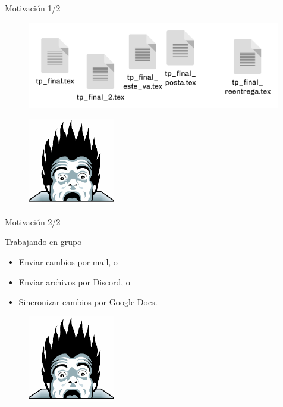 
\begin{frame}{Motivación 1/2}

    \begin{figure}[ht]
        \begin{center}
            \includegraphics[height=1.5in]{images/caos.png}
        \end{center}
    \end{figure}

    \pause
    \begin{figure}[ht]
        \begin{center}
            \includegraphics[height=1.5in]{images/horror.png}
        \end{center}
    \end{figure}
\end{frame}
\begin{frame}{Motivación 2/2}

    \begin{block}{Trabajando en grupo}
        \begin{itemize}
            \item Enviar cambios por mail, o
            \pause
            \item Enviar archivos por Discord, o
            \pause
            \item Sincronizar cambios por Google Docs.
        \end{itemize}
    \end{block}

    \pause
    \begin{figure}[h]
        \begin{center}
            \includegraphics[height=1.5in]{images/horror.png}
        \end{center}
    \end{figure}

\end{frame}

